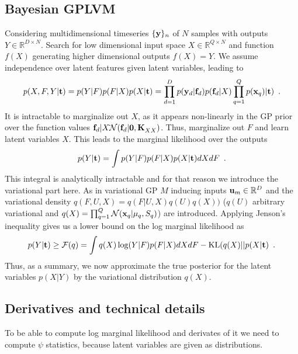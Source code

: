 \documentclass[11pt, a4paper]{article}
\begin{document}
\subsection{Bayesian GPLVM }
\label{sec:vargplvm}
Considering multidimensional timeseries $\{{\bf y}\}_n$ of $N$ samples with outputs $Y\in\mathbb R^{D\times N}$. Search for low dimensional input space $X\in\mathbb R^{Q\times N}$ and function $f(X)$ generating higher dimensional outputs $f(X) = Y$. We assume independence over latent features given latent variables, leading to
\begin{equation}
  \label{eq:vargplvmmodel}
  p(X,F,Y|{\bf t})=p(Y|F)p(F|X)p(X|{\bf t})=\prod_{d=1}^Dp({\bf y}_d|{\bf f}_d)p({\bf f}_d|X)\prod_{q=1}^Qp({\bf x}_q)|{\bf t})\enspace.
\end{equation}
It is intractable to marginalize out $X$, as it appears non-linearly in the GP prior over the function values ${\bf f}_d|X\tilde{}\mathcal{N}({\bf f}_d|{\bf 0,K}_{XX})$. Thus, marginalize out $F$ and learn latent variables $X$. This leads to the marginal likelihood over the outputs
\begin{equation}
  \label{eq:lmlvargplvm}
  p(Y|{\bf t}) = \int p(Y|F)p(F|X)p(X|{\bf t}) dXdF\enspace.
\end{equation}
This integral is analytically intractable and for that reason we introduce the variational part here. As in variational GP $M$ inducing inputs ${\bf u}_m\in\mathbb R^{D}$ and the variational density $q(F,U,X)=q(F|U,X)q(U)q(X))$ ($q(U)$ arbitrary variational and $q(X)=\prod_{q=1}^Q\mathcal N({\bf x}_q|{\bf \mu}_q,S_q)$) are introduced. Applying Jenson's inequality gives us a lower bound on the log marginal likelihood as
\begin{equation}
  \label{eq:lowerboundlml}
  p(Y|{\bf t})\geq \mathcal F(q) = \int q(X)\log (Y|F)p(F|X) dXdF - \text{KL}(q(X) || p(X|{\bf t})\enspace.
\end{equation}
Thus, as a summary, we now approximate the true posterior for the latent variables $p(X|Y)$ by the variational distribution $q(X)$. 

\subsection{Derivatives and technical details}
\label{sec:vargplvml:derv_techdet}
To be able to compute log marginal likelihood and derivates of it we need to compute $\psi$ statistics, because latent variables are given as distributions. 
\end{document}
